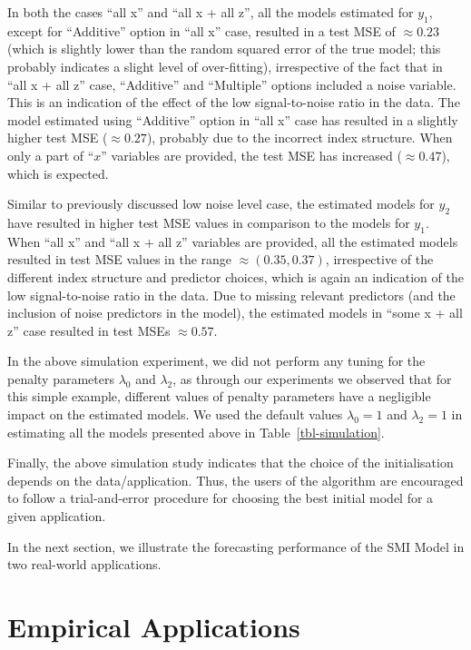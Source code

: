 \documentclass[11pt,a4paper,]{article}
\begin{document}
In both the cases ``all x'' and ``all x + all z'', all the models
estimated for \(y_{1}\), except for ``Additive'' option in ``all x''
case, resulted in a test MSE of \(\approx 0.23\) (which is slightly
lower than the random squared error of the true model; this probably
indicates a slight level of over-fitting), irrespective of the fact that
in ``all x + all z'' case, ``Additive'' and ``Multiple'' options
included a noise variable. This is an indication of the effect of the
low signal-to-noise ratio in the data. The model estimated using
``Additive'' option in ``all x'' case has resulted in a slightly higher
test MSE (\(\approx 0.27\)), probably due to the incorrect index
structure. When only a part of ``\(x\)'' variables are provided, the
test MSE has increased (\(\approx 0.47\)), which is expected.

Similar to previously discussed low noise level case, the estimated
models for \(y_{2}\) have resulted in higher test MSE values in
comparison to the models for \(y_{1}\). When ``all x'' and ``all x + all
z'' variables are provided, all the estimated models resulted in test
MSE values in the range \(\approx (0.35, 0.37)\), irrespective of the
different index structure and predictor choices, which is again an
indication of the low signal-to-noise ratio in the data. Due to missing
relevant predictors (and the inclusion of noise predictors in the
model), the estimated models in ``some x + all z'' case resulted in test
MSEs \(\approx 0.57\).

In the above simulation experiment, we did not perform any tuning for
the penalty parameters \(\lambda_{0}\) and \(\lambda_{2}\), as through
our experiments we observed that for this simple example, different
values of penalty parameters have a negligible impact on the estimated
models. We used the default values \(\lambda_{0} = 1\) and
\(\lambda_{2} = 1\) in estimating all the models presented above in
Table~\ref{tbl-simulation}.

Finally, the above simulation study indicates that the choice of the
initialisation depends on the data/application. Thus, the users of the
algorithm are encouraged to follow a trial-and-error procedure for
choosing the best initial model for a given application.

In the next section, we illustrate the forecasting performance of the
SMI Model in two real-world applications.

\hypertarget{sec-application}{%
\section{Empirical Applications}\label{sec-application}}
\end{document}

